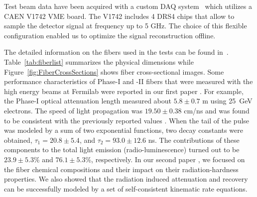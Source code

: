 \documentclass[a4paper,11pt]{article}
\begin{document}
Test beam data have been acquired with a custom DAQ system~\cite{r-MAR} which utilizes a CAEN V1742 VME board. The V1742 includes 4 DRS4 chips that allow to sample the detector signal at frequency up to 5 GHz. The choice of this flexible configuration enabled us to optimize the signal reconstruction offline.

The detailed information on the fibers used in the tests can be found in~\cite{JINSTPaper}.  Table~\ref{tab:fiberlist} summarizes the physical dimensions while Figure~\ref{fig:FiberCrossSections} shows fiber cross-sectional images.  Some performance characteristics of Phase-I and -II fibers that were measured with the high energy beams at Fermilab were reported in our first paper \cite{JINSTPaper}.  For example, the Phase-I optical attenuation length measured about $5.8\pm0.7$ m using 25~GeV  electrons.  The speed of light propagation was $19.50\pm0.38$ cm/ns and was found to be consistent with the previously reported values \cite{Goro,Akch97}.  When the tail of the pulse was modeled by a sum of two exponential functions, two decay constants were obtained, $\tau_1= 20.8\pm5.4$, and $\tau_2= 93.0\pm12.6$ ns.  The contributions of these components to the total light emission (radio-luminescence) turned out to be $23.9\pm5.3$\% and $76.1\pm5.3$\%, respectively.  In our second paper \cite{JINSTPaper2}, we focused on the fiber chemical compositions and their impact on their radiation-hardness properties.  We also showed that the radiation induced attenuation and recovery can be successfully modeled by a set of self-consistent kinematic rate equations.
\end{document}
